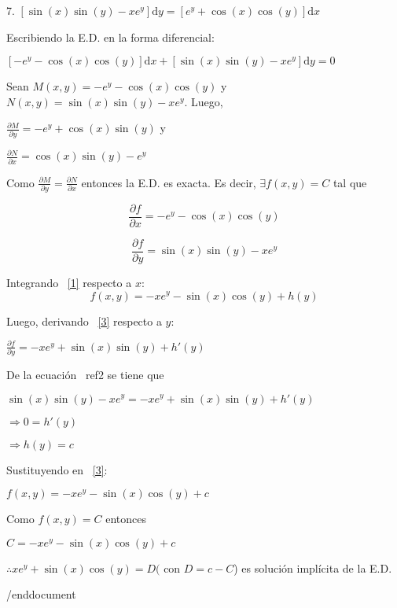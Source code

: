 \documentclass{article}
\begin{document}
      7. $ [\sin (x) \sin (y) - xe^y] \mathrm{d}y = [e^y + \cos (x) \cos (y)] \mathrm{d}x $

      Escribiendo la E.D. en la forma diferencial:

      $ [-e^y - \cos (x) \cos (y)] \mathrm{d}x + [\sin (x) \sin (y) - xe^y] \mathrm{d}y = 0 $

      Sean $ M(x,y) = -e^y - \cos (x) \cos (y) $ y $ N(x,y) = \sin (x) \sin (y) - xe^y $. Luego,

      $ \frac{\partial M}{\partial y} = -e^y + \cos (x) \sin (y) $ y

      $ \frac{\partial N}{\partial x} = \cos (x) \sin (y) -e^y $

      Como $ \frac{\partial M}{\partial y} = \frac{\partial N}{\partial x} $ entonces la E.D. es exacta. Es decir, $ \exists f(x,y) = C $ tal que

      \begin{equation}
            \label{1}
            \frac{\partial f}{\partial x} = -e^y - \cos (x) \cos (y)
      \end{equation}

      \begin{equation}
            \label{2}
            \frac{\partial f}{\partial y} = \sin (x) \sin (y) - xe^y
      \end{equation}

      Integrando ~\ref{1} respecto a $ x $:
      \begin{equation}
            \label{3}
            f(x,y) = -xe^y - \sin (x) \cos (y) + h(y)
      \end{equation}

      Luego, derivando ~\ref{3} respecto a $ y $:

      $ \frac{\partial f}{\partial y} = - xe^y + \sin (x) \sin (y) + h'(y) $

      De la ecuación ~ref{2} se tiene que

      $ \sin (x) \sin (y) - xe^y = - xe^y + \sin (x) \sin (y) + h'(y) $

      $ \Longrightarrow 0 = h'(y) $

      $ \Longrightarrow h(y) = c $

      Sustituyendo en ~\ref{3}:

      $ f(x,y) = -xe^y - \sin (x) \cos (y) + c $

      Como $ f(x,y) = C $ entonces

      $ C = -xe^y - \sin (x) \cos (y) + c $
      
      $ \therefore xe^y + \sin (x) \cos (y) = D ($ con $ D = c - C $) es solución implícita de la E.D.
      
      
      
/end{document}
\end{document}
